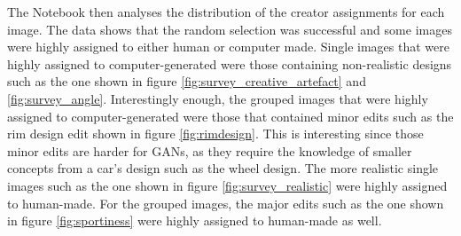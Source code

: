 The Notebook then analyses the distribution of the creator assignments for each image.
The data shows that the random selection was successful and some images were highly assigned to either human or computer made.
Single images that were highly assigned to computer-generated were those containing non-realistic designs such as the one shown in figure \ref{fig:survey_creative_artefact} and \ref{fig:survey_angle}.
Interestingly enough, the grouped images that were highly assigned to computer-generated were those that contained minor edits such as the rim design edit shown in figure \ref{fig:rimdesign}.
This is interesting since those minor edits are harder for GANs, as they require the knowledge of smaller concepts from a car's design such as the wheel design.
The more realistic single images such as the one shown in figure \ref{fig:survey_realistic} were highly assigned to human-made.
For the grouped images, the major edits such as the one shown in figure \ref{fig:sportiness} were highly assigned to human-made as well.

